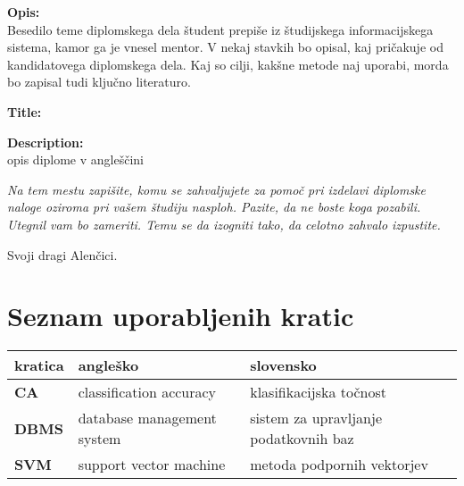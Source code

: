 \documentclass[a4paper,12pt,openright]{book}
\newcommand{\clearemptydoublepage}{\newpage{\pagestyle{empty}\cleardoublepage}}
\begin{document}
\bigskip
\noindent\textbf{Opis:}\\
Besedilo teme diplomskega dela študent prepiše iz študijskega informacijskega sistema, kamor ga je vnesel mentor. 
V nekaj stavkih bo opisal, kaj pričakuje od kandidatovega diplomskega dela. 
Kaj so cilji, kakšne metode naj uporabi, morda bo zapisal tudi ključno literaturo.

\bigskip
\noindent\textbf{Title:} 


\bigskip
\noindent\textbf{Description:}\\
opis diplome v angleščini

\vfill



\vspace{2cm}

\clearemptydoublepage

\thispagestyle{empty}\mbox{}\vfill\null\it%
\noindent
Na tem mestu zapišite, komu se zahvaljujete za pomoč pri izdelavi diplomske naloge oziroma pri vašem študiju nasploh. Pazite, da ne boste koga pozabili. Utegnil vam bo zameriti. Temu se da izogniti tako, da celotno zahvalo izpustite.
\rm\normalfont

\clearemptydoublepage

\thispagestyle{empty}\mbox{}{\textheight}\mbox{}\hfill\begin{minipage}{0.55\textwidth}%
Svoji dragi Alenčici.
\normalfont\end{minipage}

\clearemptydoublepage


\pagestyle{empty}
\def\thepage{}%
\tableofcontents{}


\clearemptydoublepage


\chapter*{Seznam uporabljenih kratic}

\noindent\begin{tabular}{p{}|p{}|p{}}    %
  {\bf kratica} & {\bf angleško}                              & {\bf slovensko} \\ \hline
  {\bf CA}      & classification accuracy               & klasifikacijska točnost \\
  {\bf DBMS} & database management system & sistem za upravljanje podatkovnih baz \\
  {\bf SVM}   & support vector machine              & metoda podpornih vektorjev \\
\end{tabular}
\end{document}
